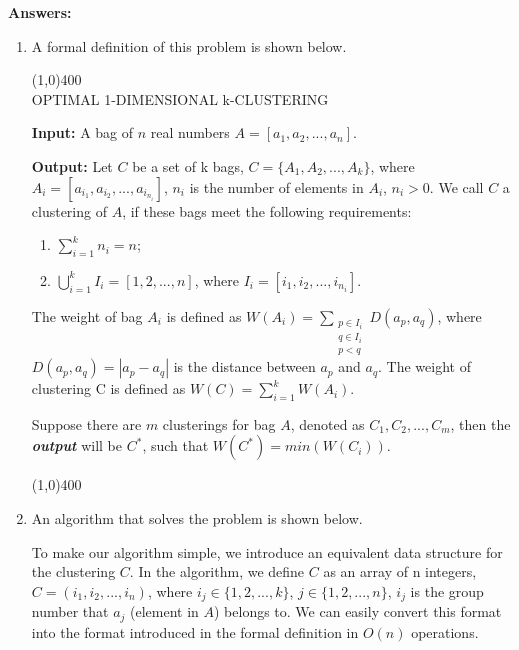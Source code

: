 \documentclass[11pt,letterpaper,oneside]{article}
\begin{document}
\noindent\textbf{Answers:}
\begin{enumerate}
\item A formal definition of this problem is shown below.

\line(1,0){400}\\
    OPTIMAL 1-DIMENSIONAL k-CLUSTERING

    \textbf{Input:} A bag of $n$ real numbers $A = [a_1, a_2, ..., a_n]$.

    \textbf{Output:} Let $C$ be a set of k bags, $C = \{A_1, A_2, ..., A_k\}$, where $A_i = [a_{i_1}, a_{i_2}, ..., a_{i_{n_i}}]$, $n_i$ is the number of elements in $A_i$, $n_i > 0$. We call $C$ a clustering of $A$, if these bags meet the following requirements:
    \begin{enumerate}
      \item $\sum_{i=1}^{k}n_i = n$;
      \item $\bigcup_{i=1}^{k}I_i = [1, 2, ..., n]$, where $I_i = [i_1, i_2, ..., i_{n_i}]$.
    \end{enumerate}
    The weight of bag $A_i$ is defined as $W(A_i) = \sum_{\substack{p \in I_i\\q \in I_i\\p<q}}D(a_p,a_q)$, where $D(a_p,a_q) = |a_p-a_q|$ is the distance between $a_p$ and $a_q$.
    The weight of clustering C is defined as $W(C) = \sum_{i=1}^{k}W(A_i)$.

    Suppose there are $m$ clusterings for bag $A$, denoted as $C_1, C_2, ..., C_m$, then the \textbf{\emph{output}} will be $C^*$, such that $W(C^*) = min(W(C_i))$.

\vspace{-1em}\line(1,0){400}
\item An algorithm that solves the problem is shown below.

To make our algorithm simple, we introduce an equivalent data structure for the clustering $C$. In the algorithm, we define $C$ as an array of n integers, $C = (i_1, i_2, ..., i_n)$, where $i_j \in \{1, 2, ..., k\}$, $j \in \{1, 2, ..., n\}$, $i_j$ is the group number that $a_j$ (element in $A$) belongs to. We can easily convert this format into the format introduced in the formal definition in $O(n)$ operations.


\end{enumerate}
\end{document}
